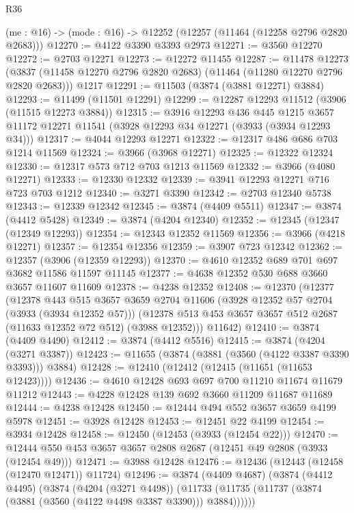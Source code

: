 \begin{lexlean}{R36}
\begin{coremodule}
  (me : @16) -> (mode : @16) -> @12252 (@12257 (@11464 (@12258 @2796 @2820 @2683)))
@12270 := @4122 @3390 @3393 @2973
@12271 := @3560 @12270
@12272 := @2703 @12271
@12273 := @12272 @11455
@12287 := @11478
    @12273
    (@3837 (@11458 @12270 @2796 @2820 @2683) (@11464 (@11280 @12270 @2796 @2820 @2683)))
    @1217
@12291 := @11503 (@3874 (@3881 @12271) @3884)
@12293 := @11499 (@11501 @12291)
@12299 := @12287 @12293 @11512 (@3906 (@11515 @12273 @3884))
@12315 := @3916
    @12293
    @436
    @445
    @1215
    @3657
    @11172
    @12271
    @11541
    (@3928 @12293 @34 @12271 (@3933 (@3934 @12293 @34)))
@12317 := @4044 @12293 @12271
@12322 := @12317 @486 @686 @703 @1214 @11569
@12324 := @3966 (@3968 @12271)
@12325 := @12322 @12324
@12330 := @12317 @573 @712 @703 @1213 @11569
@12332 := @3966 (@4080 @12271)
@12333 := @12330 @12332
@12339 := @3941 @12293 @12271 @716 @723 @703 @1212
@12340 := @3271 @3390
@12342 := @2703 @12340 @5738
@12343 := @12339 @12342
@12345 := @3874 (@4409 @5511)
@12347 := @3874 (@4412 @5428)
@12349 := @3874 (@4204 @12340)
@12352 := @12345 (@12347 (@12349 @12293))
@12354 := @12343 @12352 @11569
@12356 := @3966 (@4218 @12271)
@12357 := @12354 @12356
@12359 := @3907 @723 @12342
@12362 := @12357 (@3906 (@12359 @12293))
@12370 := @4610 @12352 @689 @701 @697 @3682 @11586 @11597 @11145
@12377 := @4638 @12352 @530 @688 @3660 @3657 @11607 @11609
@12378 := @4238 @12352
@12408 := @12370
    (@12377
      (@12378
        @443
        @515
        @3657
        @3659
        @2704
        @11606
        (@3928 @12352 @57 @2704 (@3933 (@3934 @12352 @57)))
        (@12378 @513 @453 @3657 @3657 @512 @2687 (@11633 @12352 @72 @512) (@3988 @12352)))
      @11642)
@12410 := @3874 (@4409 @4490)
@12412 := @3874 (@4412 @5516)
@12415 := @3874 (@4204 (@3271 @3387))
@12423 := @11655 (@3874 (@3881 (@3560 (@4122 @3387 @3390 @3393))) @3884)
@12428 := @12410 (@12412 (@12415 (@11651 (@11653 @12423))))
@12436 := @4610 @12428 @693 @697 @700 @11210 @11674 @11679 @11212
@12443 := @4228 @12428 @139 @692 @3660 @11209 @11687 @11689
@12444 := @4238 @12428
@12450 := @12444 @494 @552 @3657 @3659 @4199 @5978
@12451 := @3928 @12428
@12453 := @12451 @22 @4199
@12454 := @3934 @12428
@12458 := @12450 (@12453 (@3933 (@12454 @22)))
@12470 := @12444 @550 @453 @3657 @3657 @2808 @2687 (@12451 @49 @2808 (@3933 (@12454 @49)))
@12471 := @3988 @12428
@12476 := @12436 (@12443 (@12458 (@12470 @12471)) @11724)
@12496 := @3874
    (@4409 @4687)
    (@3874
      (@4412 @4495)
      (@3874
        (@4204 (@3271 @4498))
        (@11733 (@11735 (@11737 (@3874 (@3881 (@3560 (@4122 @4498 @3387 @3390))) @3884))))))

\end{coremodule}
\end{lexlean}
